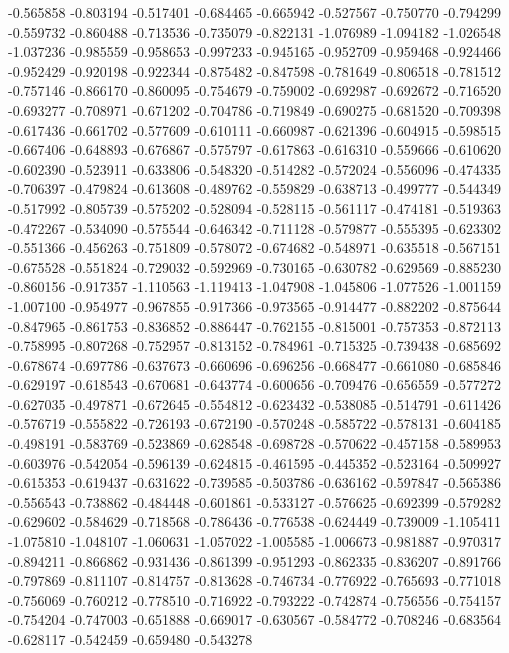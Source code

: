 -0.565858
-0.803194
-0.517401
-0.684465
-0.665942
-0.527567
-0.750770
-0.794299
-0.559732
-0.860488
-0.713536
-0.735079
-0.822131
-1.076989
-1.094182
-1.026548
-1.037236
-0.985559
-0.958653
-0.997233
-0.945165
-0.952709
-0.959468
-0.924466
-0.952429
-0.920198
-0.922344
-0.875482
-0.847598
-0.781649
-0.806518
-0.781512
-0.757146
-0.866170
-0.860095
-0.754679
-0.759002
-0.692987
-0.692672
-0.716520
-0.693277
-0.708971
-0.671202
-0.704786
-0.719849
-0.690275
-0.681520
-0.709398
-0.617436
-0.661702
-0.577609
-0.610111
-0.660987
-0.621396
-0.604915
-0.598515
-0.667406
-0.648893
-0.676867
-0.575797
-0.617863
-0.616310
-0.559666
-0.610620
-0.602390
-0.523911
-0.633806
-0.548320
-0.514282
-0.572024
-0.556096
-0.474335
-0.706397
-0.479824
-0.613608
-0.489762
-0.559829
-0.638713
-0.499777
-0.544349
-0.517992
-0.805739
-0.575202
-0.528094
-0.528115
-0.561117
-0.474181
-0.519363
-0.472267
-0.534090
-0.575544
-0.646342
-0.711128
-0.579877
-0.555395
-0.623302
-0.551366
-0.456263
-0.751809
-0.578072
-0.674682
-0.548971
-0.635518
-0.567151
-0.675528
-0.551824
-0.729032
-0.592969
-0.730165
-0.630782
-0.629569
-0.885230
-0.860156
-0.917357
-1.110563
-1.119413
-1.047908
-1.045806
-1.077526
-1.001159
-1.007100
-0.954977
-0.967855
-0.917366
-0.973565
-0.914477
-0.882202
-0.875644
-0.847965
-0.861753
-0.836852
-0.886447
-0.762155
-0.815001
-0.757353
-0.872113
-0.758995
-0.807268
-0.752957
-0.813152
-0.784961
-0.715325
-0.739438
-0.685692
-0.678674
-0.697786
-0.637673
-0.660696
-0.696256
-0.668477
-0.661080
-0.685846
-0.629197
-0.618543
-0.670681
-0.643774
-0.600656
-0.709476
-0.656559
-0.577272
-0.627035
-0.497871
-0.672645
-0.554812
-0.623432
-0.538085
-0.514791
-0.611426
-0.576719
-0.555822
-0.726193
-0.672190
-0.570248
-0.585722
-0.578131
-0.604185
-0.498191
-0.583769
-0.523869
-0.628548
-0.698728
-0.570622
-0.457158
-0.589953
-0.603976
-0.542054
-0.596139
-0.624815
-0.461595
-0.445352
-0.523164
-0.509927
-0.615353
-0.619437
-0.631622
-0.739585
-0.503786
-0.636162
-0.597847
-0.565386
-0.556543
-0.738862
-0.484448
-0.601861
-0.533127
-0.576625
-0.692399
-0.579282
-0.629602
-0.584629
-0.718568
-0.786436
-0.776538
-0.624449
-0.739009
-1.105411
-1.075810
-1.048107
-1.060631
-1.057022
-1.005585
-1.006673
-0.981887
-0.970317
-0.894211
-0.866862
-0.931436
-0.861399
-0.951293
-0.862335
-0.836207
-0.891766
-0.797869
-0.811107
-0.814757
-0.813628
-0.746734
-0.776922
-0.765693
-0.771018
-0.756069
-0.760212
-0.778510
-0.716922
-0.793222
-0.742874
-0.756556
-0.754157
-0.754204
-0.747003
-0.651888
-0.669017
-0.630567
-0.584772
-0.708246
-0.683564
-0.628117
-0.542459
-0.659480
-0.543278
